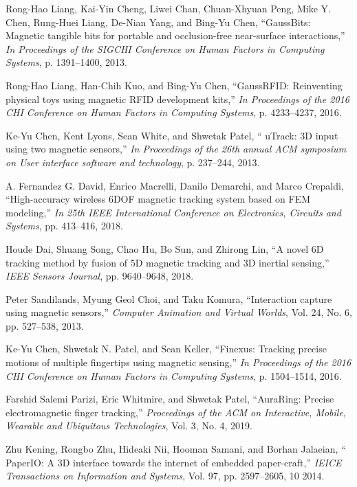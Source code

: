 \documentclass[journal,twoside,web]{ieeecolor}
\begin{document}
\begin{thebibliography}{00}
 Rong-Hao Liang, Kai-Yin Cheng, Liwei Chan, Chuan-Xhyuan Peng,
Mike Y. Chen, Rung-Huei Liang, De-Nian Yang, and Bing-Yu Chen, ``GaussBits: Magnetic tangible bits for portable and occlusion-free
near-surface interactions,'' \emph{In Proceedings of the SIGCHI Conference
on Human Factors in Computing Systems}, p. 1391–1400, 2013.

 Rong-Hao Liang, Han-Chih Kuo, and Bing-Yu Chen, ``GaussRFID:
Reinventing physical toys using magnetic RFID development kits,'' \emph{In Proceedings of the 2016 CHI Conference on Human Factors in
Computing Systems},  p. 4233–4237, 2016.

 Ke-Yu Chen, Kent Lyons, Sean White, and Shwetak Patel, `` uTrack:
3D input using two magnetic sensors,'' \emph{In Proceedings of the 26th
annual ACM symposium on User interface software and technology},  p. 237–244, 2013.

 A. Fernandez G. David, Enrico Macrelli, Danilo Demarchi, and
Marco Crepaldi, ``High-accuracy wireless 6DOF magnetic tracking
system based on FEM modeling,'' \emph{ In 25th IEEE International Conference on Electronics, Circuits and Systems},  pp. 413–416, 2018.

 Houde Dai, Shuang Song, Chao Hu, Bo Sun, and Zhirong Lin, ``A
novel 6D tracking method by fusion of 5D magnetic tracking and
3D inertial sensing,'' \emph{IEEE Sensors Journal},   pp. 9640–9648, 2018.

 Peter Sandilands, Myung Geol Choi, and Taku Komura, ``Interaction capture using magnetic sensors,'' \emph{Computer Animation and
Virtual Worlds},  Vol. 24, No. 6, pp. 527–538, 2013.

 Ke-Yu Chen, Shwetak N. Patel, and Sean Keller, ``Finexus: Tracking precise motions of multiple fingertips using magnetic sensing,'' \emph{In Proceedings of the 2016 CHI Conference on Human Factors in
Computing Systems}, p. 1504–1514, 2016.

 Farshid Salemi Parizi, Eric Whitmire, and Shwetak Patel, ``AuraRing: Precise electromagnetic finger tracking,'' \emph{Proceedings of the
ACM on Interactive, Mobile, Wearable and Ubiquitous Technologies}, Vol. 3, No. 4, 2019.

 Zhu Kening, Rongbo Zhu, Hideaki Nii, Hooman Samani, and
Borhan Jalaeian, `` PaperIO: A 3D interface towards the internet
of embedded paper-craft,'' \emph{IEICE Transactions on Information and
Systems}, Vol. 97, pp. 2597–2605, 10 2014.


\end{thebibliography}
\end{document}
